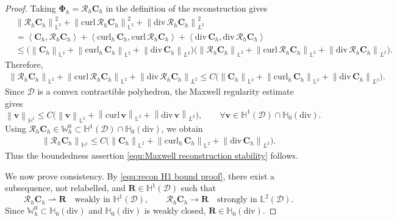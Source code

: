 \documentclass[11pt, reqno]{amsart}
\theoremstyle{definition}
\numberwithin{equation}{section}
\newcommand{\curl}{\mathrm{curl}\,}
\newcommand{\divg}{\mathrm{div}\,}
\newcommand{\bff}{\boldsymbol}
\newcommand{\bb}{\mathbb}
\newcommand{\norm}[2]{\left\|{#1}\right\|_{#2}}
\newcommand{\inpro}[2]{\left\langle#1,#2\right\rangle}
\newcommand{\hzerodiv}{\mathbb{H}_0(\mathrm{div})}
\newcommand{\curlh}{\mathrm{curl}_h\,}
\begin{document}
\begin{proof}
	Taking $\bff\Phi_h=\mathcal R_h\bff C_h$ in the definition of the reconstruction gives
	\begin{align*}
		&\norm{\mathcal R_h\bff C_h}{\bb L^2}^2
		+\norm{\curl\mathcal R_h\bff C_h}{\bb L^2}^2
		+\norm{\divg\mathcal R_h\bff C_h}{L^2}^2
		\\
		&=
		\inpro{\bff C_h}{\mathcal R_h\bff C_h}
		+\inpro{\curlh\bff C_h}{\curl\mathcal R_h\bff C_h}
		+\inpro{\divg\bff C_h}{\divg\mathcal R_h\bff C_h}
		\\
		&\le
		\bigl(
		\norm{\bff C_h}{\bb L^2}
		+\norm{\curlh\bff C_h}{\bb L^2}
		+\norm{\divg\bff C_h}{L^2}
		\bigr)
		\bigl(
		\norm{\mathcal R_h\bff C_h}{\bb L^2}
		+\norm{\curl\mathcal R_h\bff C_h}{\bb L^2}
		+\norm{\divg\mathcal R_h\bff C_h}{L^2}
		\bigr).
	\end{align*}
	Therefore,
	\begin{align}
		\label{equ:recon graph bound proof}
		\norm{\mathcal R_h\bff C_h}{\bb L^2}
		+\norm{\curl\mathcal R_h\bff C_h}{\bb L^2}
		+\norm{\divg\mathcal R_h\bff C_h}{L^2}
		\le
		C\bigl(
		\norm{\bff C_h}{\bb L^2}
		+\norm{\curlh\bff C_h}{\bb L^2}
		+\norm{\divg\bff C_h}{L^2}
		\bigr).
	\end{align}
	Since $\mathscr D$ is a convex contractible polyhedron, the Maxwell regularity estimate gives
	\[
	\norm{\bff v}{\bb H^1}
	\le
	C\bigl(
	\norm{\bff v}{\bb L^2}
	+\norm{\curl\bff v}{\bb L^2}
	+\norm{\divg\bff v}{L^2}
	\bigr),
	\qquad
	\forall \bff v\in \bb H^1(\mathscr D)\cap\hzerodiv .
	\]
	Using $\mathcal R_h\bff C_h\in\bb W_h^0\subset \bb H^1(\mathscr D)\cap\hzerodiv$, we obtain
	\begin{align}
		\label{equ:recon H1 bound proof}
		\norm{\mathcal R_h\bff C_h}{\bb H^1}
		\le
		C\bigl(
		\norm{\bff C_h}{\bb L^2}
		+\norm{\curlh\bff C_h}{\bb L^2}
		+\norm{\divg\bff C_h}{L^2}
		\bigr).
	\end{align}
	Thus the boundedness assertion \eqref{equ:Maxwell reconstruction stability} follows.
	
	We now prove consistency. By \eqref{equ:recon H1 bound proof}, there exist a subsequence, not relabelled, and $\bff R\in\bb H^1(\mathscr D)$ such that
	\[
	\mathcal R_h\bff C_h\rightharpoonup\bff R\quad\text{weakly in }\bb H^1(\mathscr D),
	\qquad
	\mathcal R_h\bff C_h\to\bff R\quad\text{strongly in }\bb L^2(\mathscr D).
	\]
	Since $\bb W_h^0\subset\hzerodiv$ and $\hzerodiv$ is weakly closed, $\bff R\in\hzerodiv$.
	

\end{proof}
\end{document}
